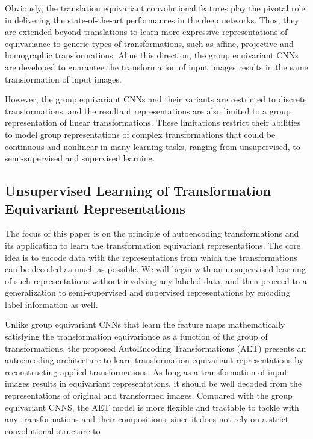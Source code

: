 \documentclass[10pt,journal,compsoc,twoside]{IEEEtran}
\begin{document}
Obviously, the translation equivariant convolutional features play the pivotal role in delivering the state-of-the-art performances in the deep networks. Thus, they are extended beyond translations to learn more expressive representations of equivariance to generic types of transformations, such as affine, projective and homographic transformations. Aline this direction, the group equivariant CNNs \cite{cohen2016group}
are developed to guarantee the transformation of input images results in the same transformation of input images.


However, the group equivariant CNNs \cite{cohen2016group} and their variants \cite{cohen2016steerable,lenssen2018group} are restricted to discrete transformations, and the resultant representations are also limited to a group representation of linear transformations. These limitations restrict their abilities to model group representations of complex transformations that could be continuous and nonlinear in many learning tasks, ranging from unsupervised, to semi-supervised and supervised learning.



\subsection{Unsupervised Learning of Transformation Equivariant Representations}

The focus of this paper is on the principle of autoencoding transformations and its application to learn the transformation equivariant representations. The core idea is to encode data with the representations from which the transformations can be decoded as much as possible. We will begin with an unsupervised learning of such representations without involving any labeled data, and then proceed to a generalization to semi-supervised and supervised representations by encoding label information as well.

Unlike group equivariant CNNs that learn the feature maps mathematically satisfying the transformation equivariance as a function of the group of transformations, the proposed AutoEncoding Transformations (AET) presents an autoencoding architecture to learn transformation equivariant representations by reconstructing applied transformations. As long as a transformation of input images results in equivariant representations, it should be well decoded from the representations of original and transformed images.  Compared with the group equivariant CNNS, the AET model is more flexible and tractable to tackle with any transformations and their compositions, since it does not rely on a strict convolutional structure to
\end{document}

